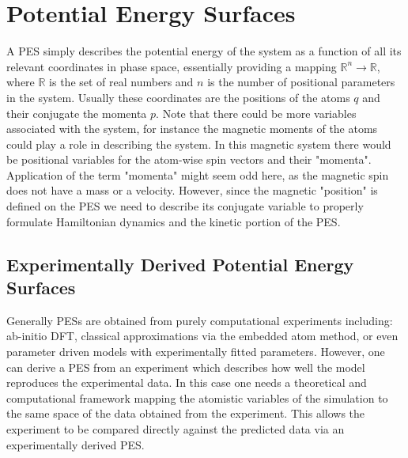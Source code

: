 \section{Potential Energy Surfaces} \label{sec:pes}
A PES simply describes the potential energy of the system as a function of all its relevant coordinates in phase space, essentially providing a mapping $\mathbb{R}^{n} \rightarrow \mathbb{R}$, where $\mathbb{R}$ is the set of real numbers and $n$ is the number of positional parameters in the system.
Usually these coordinates are the positions of the atoms $q$ and their conjugate the momenta $p$.
Note that there could be more variables associated with the system, for instance the magnetic moments of the atoms could play a role in describing the system.
In this magnetic system there would be positional variables for the atom-wise spin vectors and their "momenta".
Application of the term "momenta" might seem odd here, as the magnetic spin does not have a mass or a velocity.
However, since the magnetic "position" is defined on the PES we need to describe its conjugate variable to properly formulate Hamiltonian dynamics and the kinetic portion of the PES.

\subsection{Experimentally Derived Potential Energy Surfaces}
Generally PESs are obtained from purely computational experiments including: ab-initio DFT, classical approximations via the embedded atom method, or even parameter driven models with experimentally fitted parameters.
However, one can derive a PES from an experiment which describes how well the model reproduces the experimental data.
In this case one needs a theoretical and computational framework mapping the atomistic variables of the simulation to the same space of the data obtained from the experiment.
This allows the experiment to be compared directly against the predicted data via an experimentally derived PES.
